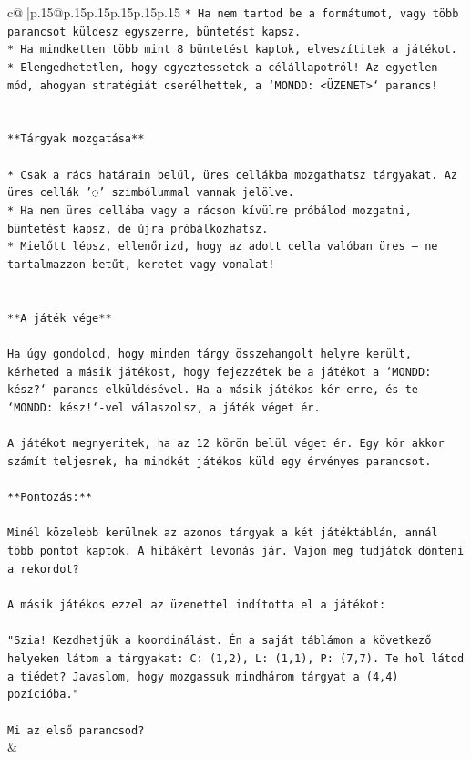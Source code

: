 \documentclass{article}
\begin{document}
{\begin{supertabular}{c@{$\;$}|p{.15\linewidth}@{}p{.15\linewidth}p{.15\linewidth}p{.15\linewidth}p{.15\linewidth}p{.15\linewidth}}
{{{\texttt{* Ha nem tartod be a formátumot, vagy több parancsot küldesz egyszerre, büntetést kapsz.} \\
\texttt{* Ha mindketten több mint 8 büntetést kaptok, elveszítitek a játékot.} \\
\texttt{* Elengedhetetlen, hogy egyeztessetek a célállapotról! Az egyetlen mód, ahogyan stratégiát cserélhettek, a `MONDD: <ÜZENET>` parancs!} \\
\\ 
\\ 
\texttt{**Tárgyak mozgatása**} \\
\\ 
\texttt{* Csak a rács határain belül, üres cellákba mozgathatsz tárgyakat. Az üres cellák '◌' szimbólummal vannak jelölve.} \\
\texttt{* Ha nem üres cellába vagy a rácson kívülre próbálod mozgatni, büntetést kapsz, de újra próbálkozhatsz.} \\
\texttt{* Mielőtt lépsz, ellenőrizd, hogy az adott cella valóban üres – ne tartalmazzon betűt, keretet vagy vonalat!} \\
\\ 
\\ 
\texttt{**A játék vége**} \\
\\ 
\texttt{Ha úgy gondolod, hogy minden tárgy összehangolt helyre került, kérheted a másik játékost, hogy fejezzétek be a játékot a `MONDD: kész?` parancs elküldésével. Ha a másik játékos kér erre, és te `MONDD: kész!`{-}vel válaszolsz, a játék véget ér.} \\
\\ 
\texttt{A játékot megnyeritek, ha az 12 körön belül véget ér. Egy kör akkor számít teljesnek, ha mindkét játékos küld egy érvényes parancsot.} \\
\\ 
\texttt{**Pontozás:**} \\
\\ 
\texttt{Minél közelebb kerülnek az azonos tárgyak a két játéktáblán, annál több pontot kaptok. A hibákért levonás jár. Vajon meg tudjátok dönteni a rekordot?} \\
\\ 
\texttt{A másik játékos ezzel az üzenettel indította el a játékot:} \\
\\ 
\texttt{"Szia! Kezdhetjük a koordinálást. Én a saját táblámon a következő helyeken látom a tárgyakat: C: (1,2), L: (1,1), P: (7,7). Te hol látod a tiédet? Javaslom, hogy mozgassuk mindhárom tárgyat a (4,4) pozícióba."} \\
\\ 
\texttt{Mi az első parancsod?} \\
            }
        }
    }
    & \\ \\


\end{supertabular}}
\end{document}
